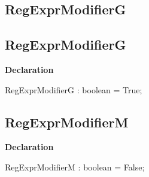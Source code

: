 \documentclass{report}
\newif\ifpdf
\begin{document}
\subsection*{\large{\textbf{RegExprModifierG}}\normalsize\hspace{1ex}\hrulefill}
\else
\subsection*{RegExprModifierG}
\fi
\label{RegExpr-RegExprModifierG}
\begin{list}{}{
\setlength{\itemindent}{0cm}
\setlength{\listparindent}{0cm}
\setlength{\leftmargin}{\evensidemargin}
\addtolength{\leftmargin}{\tmplength}
\settowidth{\labelsep}{X}
\addtolength{\leftmargin}{\labelsep}
\setlength{\labelwidth}{\tmplength}
}
\item[\textbf{Declaration}\hfill]
\ifpdf
\begin{flushleft}
\fi
\begin{ttfamily}
RegExprModifierG : boolean = True;\end{ttfamily}

\ifpdf
\end{flushleft}
\fi

\end{list}
\ifpdf
\subsection*{\large{\textbf{RegExprModifierM}}\normalsize\hspace{1ex}\hrulefill}
\else
\subsection*{RegExprModifierM}
\fi
\label{RegExpr-RegExprModifierM}
\begin{list}{}{
\setlength{\itemindent}{0cm}
\setlength{\listparindent}{0cm}
\setlength{\leftmargin}{\evensidemargin}
\addtolength{\leftmargin}{\tmplength}
\settowidth{\labelsep}{X}
\addtolength{\leftmargin}{\labelsep}
\setlength{\labelwidth}{\tmplength}
}
\item[\textbf{Declaration}\hfill]
\ifpdf
\begin{flushleft}
\fi
\begin{ttfamily}
RegExprModifierM : boolean = False;\end{ttfamily}

\ifpdf
\end{flushleft}
\fi

\end{list}
\ifpdf
\end{document}
